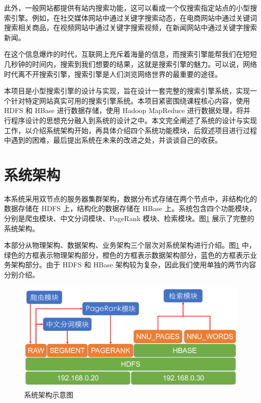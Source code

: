 \documentclass{ctexart}
\begin{document}
    此外，一般网站都提供有站内搜索功能，这可以看成一个仅搜索指定站点的小型搜索引擎。例如，在社交媒体网站中通过关键字搜索动态，在电商网站中通过关键词搜索相关商品，在视频网站中通过关键字搜索视频，在新闻网站中通过关键字搜索新闻。

    在这个信息爆炸的时代，互联网上充斥着海量的信息，而搜索引擎能帮我们在短短几秒钟的时间内，搜索到我们想要的结果，这就是搜索引擎的魅力。可以说，网络时代离不开搜索引擎，搜索引擎是人们浏览网络世界的最重要的途径。

    本项目是小型搜索引擎的设计与实现，旨在设计一套完整的搜索引擎系统，实现一个针对特定网站真实可用的搜索引擎系统。本项目紧密围绕课程核心内容，使用 HDFS 和 HBase 进行数据存储，使用 Hadoop MapReduce 进行数据处理，将并行程序设计的思想充分融入到系统的设计之中。本文完全阐述了系统的设计与实现工作，以介绍系统架构开始，再具体介绍四个系统功能模块，后叙述项目进行过程中遇到的困难，最后提出系统在未来的改进之处，并谈谈自己的收获。


    \section{系统架构}\label{sec:archicture}

    本系统采用双节点的服务器集群架构，数据分布式存储在两个节点中，非结构化的数据存储在 HDFS 上，结构化的数据存储在 HBase 上。系统包含四个功能模块，分别是爬虫模块、中文分词模块、PageRank 模块、检索模块。图\ref{fig:archicture} 展示了完整的系统架构。

    本部分从物理架构、数据架构、业务架构三个层次对系统架构进行介绍。图\ref{fig:archicture} 中，绿色的方框表示物理架构部分，橙色的方框表示数据架构部分，蓝色的方框表示业务架构部分。由于 HDFS 和 HBase 架构较为复杂，因此我们使用单独的两节内容分别介绍。

    \begin{figure}[t]
        \centering
        \includegraphics[width=\textwidth]{src/archicture}
        \caption{系统架构示意图}
        \label{fig:archicture}
    \end{figure}
\end{document}
